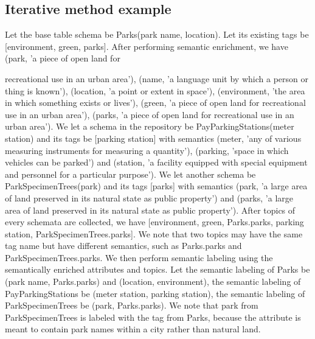 \subsection{Iterative method example}
\label{ssec:IterativeMethodExample}

Let the base table schema be Parks(park name, location). Let its existing tags be [environment, green, parks]. After performing semantic enrichment, we have (park, 'a piece of open land for

recreational use in an urban area'), (name, 'a language unit by which a person or thing is known'), (location, 'a point or extent in space'), (environment, 'the area in which something exists or lives'), (green, 'a piece of open land for recreational use in an urban area'), (parks, 'a piece of open land for recreational use in an urban area').
We let a schema in the repository be PayParkingStations(meter station) and its tags be [parking station] with semantics (meter, 'any of various measuring instruments for measuring a quantity'), (parking, 'space in which vehicles can be parked') and (station, 'a facility equipped with special equipment and personnel for a particular purpose'). We let another schema be ParkSpecimenTrees(park) and its tags [parks] with semantics (park, 'a large area of land preserved in its natural state as public property') and (parks, 'a large area of land preserved in its natural state as public property').
After topics of every schemata are collected, we have [environment, green, Parks.parks, parking station, ParkSpecimenTrees.parks]. We note that two topics may have the same tag name but have different semantics, such as Parks.parks and ParkSpecimenTrees.parks. We then perform semantic labeling using the semantically enriched attributes and topics. Let the semantic labeling of Parks be (park name, Parks.parks) and (location, environment), the semantic labeling of PayParkingStations be (meter station, parking station), the semantic labeling of ParkSpecimenTrees be (park, Parks.parks). We note that park from ParkSpecimenTrees is labeled with the tag from Parks, because the attribute is meant to contain park names within a city rather than natural land.

